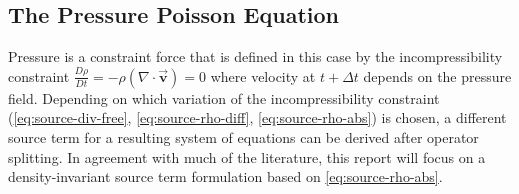 \documentclass[conference]{IEEEtran}
\newcommand\vek[1]{\vec{\bm{#1}}}
\newcommand\divergence{{\nabla\cdot}}
\begin{document}



\subsection{The Pressure Poisson Equation}

Pressure is a constraint force that is defined in this case by the incompressibility constraint $\frac{D\rho}{Dt}= -\rho(\divergence \vek{v})= 0$ where velocity at $t+\Delta t$ depends on the pressure field. Depending on which variation of the incompressibility constraint (\autoref{eq:source-div-free}, \autoref{eq:source-rho-diff}, \autoref{eq:source-rho-abs}) is chosen, a different source term for a resulting system of equations can be derived after operator splitting. In agreement with much of the literature, this report will focus on a density-invariant source term formulation based on \autoref{eq:source-rho-abs}. 
\end{document}
